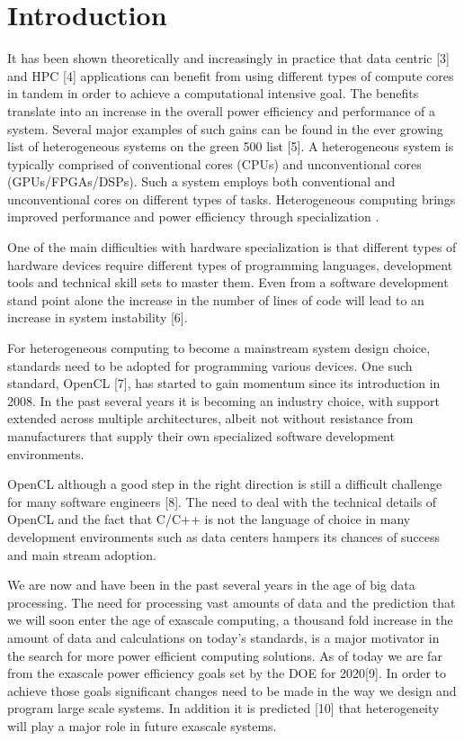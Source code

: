 \documentclass[runningheads,a4paper]{llncs}
\begin{document}
\section{Introduction}
It has been shown theoretically \cite{Chung:2010, Huang:2009} and increasingly in practice that data centric [3] and HPC [4] applications can benefit from using different types of compute cores in tandem in order to achieve a computational intensive goal. The benefits translate into an increase in the overall power efficiency and performance of a system. Several major examples of such gains can be found in the ever growing list of heterogeneous systems on the green 500 list [5]. A heterogeneous system is typically comprised of conventional cores (CPUs) and unconventional cores (GPUs/FPGAs/DSPs). Such a system employs both conventional and unconventional cores on different types of tasks. Heterogeneous computing brings improved performance and power efficiency through specialization \cite{Dongarra:2011}.

One of the main difficulties with hardware specialization is that different types of hardware devices require different types of programming languages, development tools and technical skill sets to master them. Even from a software development stand point alone the increase in the number of lines of code will lead to an increase in system instability [6].

For heterogeneous computing to become a mainstream system design choice, standards need to be adopted for programming various devices. One such standard, OpenCL [7], has started to gain momentum since its introduction in 2008. In the past several years it is becoming an industry choice, with support extended across multiple architectures, albeit not without resistance from manufacturers that supply their own specialized software development environments.

OpenCL although a good step in the right direction is still a difficult challenge for many software engineers [8]. The need to deal with the technical details of OpenCL and the fact that C/C++ is not the language of choice in many development environments such as data centers hampers its chances of success and main stream adoption.

We are now and have been in the past several years in the age of big data processing. The need for processing vast amounts of data and the prediction that we will soon enter the age of exascale computing, a thousand fold increase in the amount of data and calculations on today’s standards, is a major motivator in the search for more power efficient computing solutions. As of today we are far from the exascale power efficiency goals set by the DOE for 2020[9]. In order to achieve those goals significant changes need to be made in the way we design and program large scale systems. In addition it is predicted [10] that heterogeneity will play a major role in future exascale systems.
\end{document}
